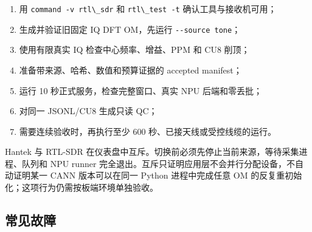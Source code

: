 \begin{enumerate}
\def\labelenumi{\arabic{enumi}.}
\tightlist
\item
  用 \passthrough{\lstinline!command -v rtl\_sdr!} 和
  \passthrough{\lstinline!rtl\_test -t!} 确认工具与接收机可用；
\item
  生成并验证旧固定 IQ DFT OM，先运行
  \passthrough{\lstinline!--source tone!}；
\item
  使用有限真实 IQ 检查中心频率、增益、PPM 和 CU8 削顶；
\item
  准备带来源、哈希、数值和预算证据的 accepted manifest；
\item
  运行 10 秒正式服务，检查完整窗口、真实 NPU 后端和零丢批；
\item
  对同一 JSONL/CU8 生成只读 QC；
\item
  需要连续验收时，再执行至少 600 秒、已接天线或受控线缆的运行。
\end{enumerate}

Hantek 与 RTL-SDR
在仪表盘中互斥。切换前必须先停止当前来源，等待采集进程、队列和 NPU
runner 完全退出。互斥只证明应用层不会并行分配设备，不自动证明某一 CANN
版本可以在同一 Python 进程中完成任意 OM
的反复重初始化；这项行为仍需按板端环境单独验收。

\subsection{常见故障}\label{src-experiment-case5-troubleshooting}

